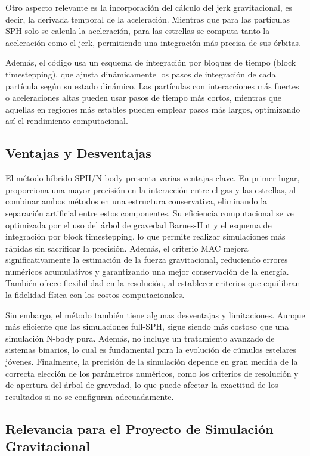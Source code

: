 Otro aspecto relevante es la incorporación del cálculo del jerk gravitacional, es decir, la derivada temporal de la aceleración. Mientras que para las partículas SPH solo se calcula la aceleración, para las estrellas se computa tanto la aceleración como el jerk, permitiendo una integración más precisa de sus órbitas.

Además, el código usa un esquema de integración por bloques de tiempo (block timestepping), que ajusta dinámicamente los pasos de integración de cada partícula según su estado dinámico. Las partículas con interacciones más fuertes o aceleraciones altas pueden usar pasos de tiempo más cortos, mientras que aquellas en regiones más estables pueden emplear pasos más largos, optimizando así el rendimiento computacional.

\newpage
\subsection{Ventajas y Desventajas}

El método híbrido SPH/N-body presenta varias ventajas clave. En primer lugar, proporciona una mayor precisión en la interacción entre el gas y las estrellas, al combinar ambos métodos en una estructura conservativa, eliminando la separación artificial entre estos componentes. Su eficiencia computacional se ve optimizada por el uso del árbol de gravedad Barnes-Hut y el esquema de integración por block timestepping, lo que permite realizar simulaciones más rápidas sin sacrificar la precisión. Además, el criterio MAC mejora significativamente la estimación de la fuerza gravitacional, reduciendo errores numéricos acumulativos y garantizando una mejor conservación de la energía. También ofrece flexibilidad en la resolución, al establecer criterios que equilibran la fidelidad física con los costos computacionales.

Sin embargo, el método también tiene algunas desventajas y limitaciones. Aunque más eficiente que las simulaciones full-SPH, sigue siendo más costoso que una simulación N-body pura. Además, no incluye un tratamiento avanzado de sistemas binarios, lo cual es fundamental para la evolución de cúmulos estelares jóvenes. Finalmente, la precisión de la simulación depende en gran medida de la correcta elección de los parámetros numéricos, como los criterios de resolución y de apertura del árbol de gravedad, lo que puede afectar la exactitud de los resultados si no se configuran adecuadamente.

\subsection{Relevancia para el Proyecto de Simulación Gravitacional}


